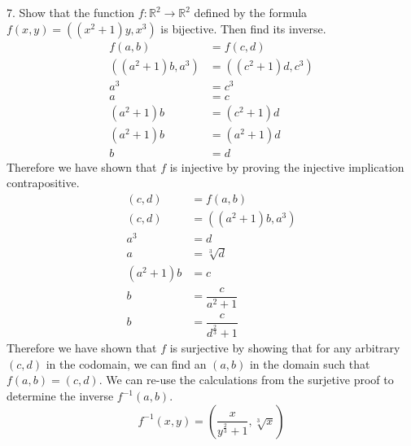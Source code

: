\documentclass{article}
\begin{document}
\begin{exercise}{}{}
	{7. Show that the function $f: \mathbb{R}^2 \rightarrow
			\mathbb{R}^2$ defined by the formula $f(x, y)=\left(\left(x^2+1\right) y,
			x^3\right)$ is bijective. Then find its inverse.}
	\begin{align*}
		f(a, b)                               & =f(c, d)                                \\
		\left(\left(a^2+1\right)b, a^3\right) & = \left(\left(c^2+1\right)d, c^3\right) \\
		a^3                                   & =c^3                                    \\
		a                                     & =c                                      \\
		(a^2+1)b                              & = (c^2+1)d                              \\
		(a^2+1)b                              & = (a^2+1)d                              \\
		b                                     & = d
	\end{align*}
	Therefore we have shown that $f$ is injective by proving the injective
	implication contrapositive.
	\begin{align*}
		(c, d)   & = f(a, b)                               \\
		(c, d)   & = \left(\left(a^2+1\right)b, a^3\right) \\
		a^3      & =d                                      \\
		a        & =\sqrt[3]{d}                            \\
		(a^2+1)b & =c                                      \\
		b        & =\dfrac{c}{a^2+1}                       \\
		b        & =\dfrac{c}{d^{\frac{2}{3}}+1}
	\end{align*}
	Therefore we have shown that $f$ is surjective by showing that for any arbitrary
	$(c, d)$ in the codomain, we can find an $(a, b)$ in the domain such that $f(a,
		b)=(c, d)$.
	We can re-use the calculations from the surjetive proof to determine the inverse
	$f^{-1}(a, b)$.
	\[f^{-1}(x, y) = \left(\dfrac{x}{y^{\frac{2}{3}}+1}, \sqrt[3]{x}\right)
	\]
\end{exercise}{}{}
\end{document}
